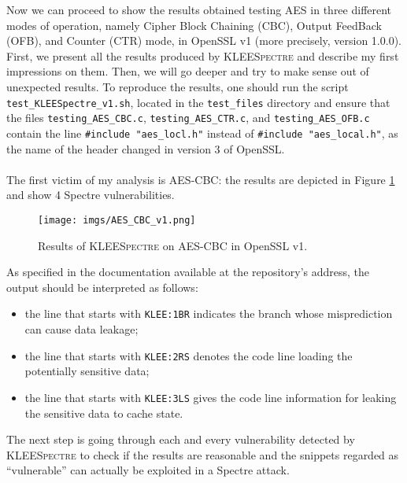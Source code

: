 \documentclass[target=mst,aauheader=aics]{thud}
\theoremstyle{definition}
\begin{document}
	Now we can proceed to show the results obtained testing AES in three different modes of operation, namely Cipher Block Chaining (CBC), Output FeedBack (OFB), and Counter (CTR) mode, in OpenSSL v1 (more precisely, version 1.0.0). First, we present all the results produced by \textsc{KLEESpectre} and describe my first impressions on them. Then, we will go deeper and try to make sense out of unexpected results. 
	To reproduce the results, one should run the script \texttt{test\_KLEESpectre\_v1.sh}, located in the \texttt{test\_files} directory and ensure that the files \texttt{testing\_AES\_CBC.c}, \texttt{testing\_AES\_CTR.c}, and \texttt{testing\_AES\_OFB.c} contain the line \texttt{\#include "aes\_locl.h"} instead of \texttt{\#include "aes\_local.h"}, as the name of the header changed in version 3 of OpenSSL.
	
	\paragraph{}The first victim of my analysis is AES-CBC: the results are depicted in Figure \ref{fig:result_cbc_v1} and show 4 Spectre vulnerabilities. 
	\begin{figure}
		\centering
		\texttt{[image: imgs/AES\_CBC\_v1.png]}
		\captionsetup{width=.9\linewidth}
		\caption{Results of \textsc{KLEESpectre} on AES-CBC in OpenSSL v1.}
		\label{fig:result_cbc_v1}
	\end{figure}
	As specified in the documentation available at the repository's address, the output should be interpreted as follows:
	\begin{itemize}
		\item the line that starts with \texttt{KLEE:1BR} indicates the branch whose misprediction can cause data leakage;
		\item the line that starts with \texttt{KLEE:2RS} denotes the code line loading the potentially sensitive data;
		\item the line that starts with \texttt{KLEE:3LS} gives the code line information for leaking the sensitive data to cache state.
	\end{itemize}
	The next step is going through each and every vulnerability detected by \textsc{KLEESpectre} to check if the results are reasonable and the snippets regarded as ``vulnerable'' can actually be exploited in a Spectre attack. 
	
\end{document}
